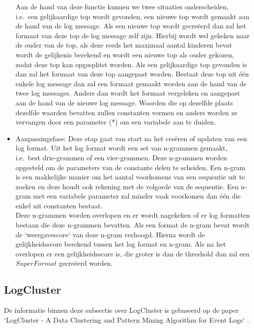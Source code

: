 \begin{itemize}
    Aan de hand van deze functie kunnen we twee situaties onderscheiden, i.e.\ een gelijkaardige top wordt gevonden, een nieuwe top wordt gemaakt aan de hand van de log message. Als een nieuwe top wordt gecreëerd dan zal het formaat van deze top de log message zelf zijn. Hierbij wordt wel gekeken naar de ouder van de top, als deze reeds het maximaal aantal kinderen bevat wordt de gelijkenis berekend en wordt een nieuwe top als ouder gekozen, zodat deze top kan opgesplitst worden. Als een gelijkaardige top gevonden is dan zal het formaat van deze top aangepast worden. Bestaat deze top uit één enkele log message dan zal een formaat gemaakt worden aan de hand van de twee log messages. Anders dan wordt het formaat vergeleken en aangepast aan de hand van de nieuwe log message. Woorden die op dezelfde plaats dezelfde waarden bevatten zullen constanten vormen en anders worden ze vervangen door een parameter (*) om een variabele aan te duiden.\\
    
    \item Aanpassingsfase: Deze stap gaat van start na het creëren of updaten van een log format. Uit het log format wordt een set van n-grammen gemaakt, i.e.\ best drie-grammen of een vier-grammen. Deze n-grammen worden opgesteld om de parameters van de constante delen te scheiden. Een n-gram is een makkelijke manier om het aantal voorkomens van een sequentie uit te zoeken en deze houdt ook rekening met de volgorde van de sequentie. Een n-gram met een variabele parameter zal minder vaak voorkomen dan één die enkel uit constanten bestaat.\\
    
    Deze n-grammen worden overlopen en er wordt nagekeken of er log formatten bestaan die deze n-grammen bevatten. Als een format de n-gram bevat wordt de `weergavescore` van deze n-gram verhoogd. Hierna wordt de gelijkheidsscore berekend tussen het log format en n-gram. Als na het overlopen er een gelijkheidsscore is, die groter is dan de threshold dan zal een $SuperFormat$ gecreëerd worden. 
\end{itemize}

\subsection{LogCluster}
De informatie binnen deze subsectie over LogCluster is gebaseerd op de paper `LogCluster - A Data Clustering and Pattern Mining Algorithm for Event Logs` \autocite{vaarandi2015logcluster}.

